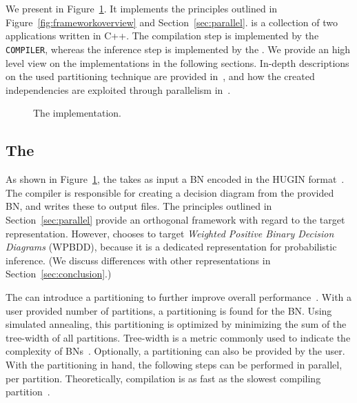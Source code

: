 \section{\toolname}
\label{sec:tool}\label{sec:implementation}

We present \toolname in Figure~\ref{fig:implementation}. It implements the principles outlined in Figure~\ref{fig:frameworkoverview} and Section~\ref{sec:parallel}. \toolname is a collection of two applications written in C++. The compilation step is implemented by the \verb+COMPILER+, whereas the inference step is implemented by the \engine. We provide an high level view on the implementations in the following sections.
In-depth descriptions on the used partitioning technique are provided in~\cite{dal2017reducing,dal2021compositional}, and how the created independencies are exploited through parallelism in~\cite{dal2018parallel}.

\begin{figure}[!t]
    \centering
    
    \caption{The implementation.}
    \label{fig:implementation}
\end{figure}

\subsection{The \compiler}

As shown in Figure~\ref{fig:implementation}, the \compiler takes as input a BN encoded in the HUGIN format~\cite{madsen2003hugin}. The compiler is responsible for creating a decision diagram from the provided BN, and writes these to output files. The principles outlined in Section~\ref{sec:parallel} provide an orthogonal framework with regard to the target representation. However, \toolname chooses to target \emph{Weighted Positive Binary Decision Diagrams} (WPBDD), because it is a dedicated representation for probabilistic inference. (We discuss differences with other representations in Section~\ref{sec:conclusion}.)

The \compiler can introduce a partitioning to further improve overall performance~\cite{dal2017reducing}. With a user provided number of partitions, a partitioning is found for the BN. Using simulated annealing, this partitioning is optimized by minimizing the sum of the  tree-width of all partitions. Tree-width is a metric commonly used to indicate the complexity of BNs~\cite{bollig2014width}. Optionally, a partitioning can also be provided by the user. With the partitioning in hand, the following steps can be performed in parallel, per partition. Theoretically, compilation is as fast as the slowest compiling partition~\cite{dal2018parallel}.

